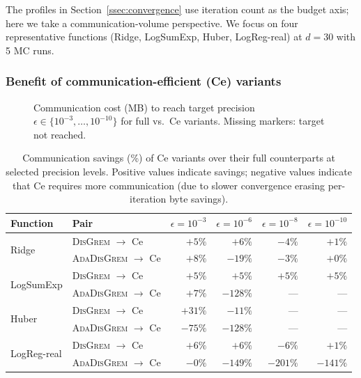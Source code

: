 \documentclass[review,onefignum,onetabnum]{siamart171218}
\begin{document}
	The profiles in Section~\ref{ssec:convergence} use iteration count
	as the budget axis; here we take a communication-volume perspective.
	We focus on four representative functions (Ridge, LogSumExp, Huber,
	LogReg-real) at $d=30$ with 5 MC runs.
	
	\subsubsection{Benefit of communication-efficient (Ce) variants}
	
	\begin{figure}[htbp]
		\centering
		\caption{Communication cost (MB) to reach target precision
			$\epsilon\in\{10^{-3},\ldots,10^{-10}\}$ for full vs.\ Ce variants.
			Missing markers: target not reached.}
		\label{fig:ce_benefit}
	\end{figure}
	
	\begin{table}[htbp]
		\centering
		\caption{Communication savings (\%) of Ce variants over their full
			counterparts at selected precision levels.
			Positive values indicate savings; negative values indicate that
			Ce requires more communication (due to slower convergence
			erasing per-iteration byte savings).}
		\label{tab:ce_savings}
		\setlength{\tabcolsep}{5pt}
		\small
		\begin{tabular}{llrrrr}
			\toprule
			Function & Pair & $\epsilon{=}10^{-3}$ & $\epsilon{=}10^{-6}$ & $\epsilon{=}10^{-8}$ & $\epsilon{=}10^{-10}$ \\
			\midrule
			\multirow{2}{*}{Ridge}
			& \textsc{DisGrem} $\to$ Ce       & $+5\%$  & $+6\%$   & $-4\%$  & $+1\%$  \\
			& \textsc{AdaDisGrem} $\to$ Ce    & $+8\%$  & $-19\%$  & $-3\%$  & $+0\%$  \\
			\midrule
			\multirow{2}{*}{LogSumExp}
			& \textsc{DisGrem} $\to$ Ce       & $+5\%$  & $+5\%$   & $+5\%$  & $+5\%$  \\
			& \textsc{AdaDisGrem} $\to$ Ce    & $+7\%$  & $-128\%$ & ---     & ---     \\
			\midrule
			\multirow{2}{*}{Huber}
			& \textsc{DisGrem} $\to$ Ce       & $+31\%$ & $-11\%$  & ---     & ---     \\
			& \textsc{AdaDisGrem} $\to$ Ce    & $-75\%$ & $-128\%$ & ---     & ---     \\
			\midrule
			\multirow{2}{*}{LogReg-real}
			& \textsc{DisGrem} $\to$ Ce       & $+6\%$  & $+6\%$   & $-6\%$  & $+1\%$  \\
			& \textsc{AdaDisGrem} $\to$ Ce    & $-0\%$  & $-149\%$ & $-201\%$ & $-141\%$ \\
			\bottomrule
		\end{tabular}
	\end{table}
	
\end{document}
